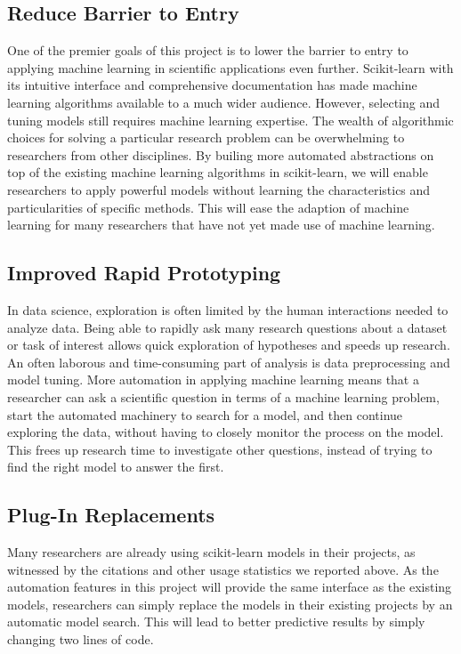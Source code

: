 \subsection{Reduce Barrier to Entry}
One of the premier goals of this project is to lower the barrier to entry
to applying machine learning in scientific applications even further.
Scikit-learn with its intuitive interface and comprehensive documentation
has made machine learning algorithms available to a much wider audience.
However, selecting and tuning models still requires machine learning expertise.
The wealth of algorithmic choices for solving a particular research problem can be
overwhelming to researchers from other disciplines. By builing more automated
abstractions on top of the existing machine learning algorithms in scikit-learn,
we will enable researchers to apply powerful models without learning
the characteristics and particularities of specific methods.
This will ease the adaption of machine learning for many researchers
that have not yet made use of machine learning.

\subsection{Improved Rapid Prototyping}
In data science, exploration is often limited by the human interactions needed to analyze data.
Being able to rapidly ask many research questions about a dataset or task of interest allows
quick exploration of hypotheses and speeds up research.
An often laborous and time-consuming part of analysis is data preprocessing and model tuning.
More automation in applying machine learning means that a researcher can ask a scientific
question in terms of a machine learning problem, start the automated machinery to
search for a model, and then continue exploring the data, without having to closely monitor
the process on the model. 
This frees up research time to investigate other questions, instead of trying to
find the right model to answer the first.

\subsection{Plug-In Replacements}
Many researchers are already using scikit-learn models in their projects, as witnessed
by the citations and other usage statistics we reported above. As the automation features
in this project will provide the same interface as the existing models, researchers
can simply replace the models in their existing projects by an automatic model search.
This will lead to better predictive results by simply changing two lines of code.


